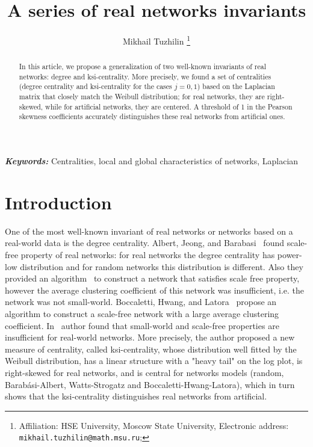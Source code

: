 \documentclass[12pt, a4paper]{extarticle}
\providecommand{\keywords}[1]
{
  \small	
  \textbf{\textit{Keywords:}} #1
}
\begin{document}
\title{A series of real networks invariants}
\author{Mikhail Tuzhilin%
  \thanks{Affiliation: HSE University, Moscow State University, Electronic address: \texttt{mikhail.tuzhilin@math.msu.ru};}
}
\date{}
\maketitle

\begin{abstract}
In this article, we propose a generalization of two well-known invariants of real networks: degree and ksi-centrality. More precisely, we found a set of centralities (degree centrality and ksi-centrality for the cases $j = 0, 1$) based on the Laplacian matrix that closely match the Weibull distribution; for real networks, they are right-skewed, while for artificial networks, they are centered. A threshold of 1 in the Pearson skewness coefficients accurately distinguishes these real networks from artificial ones.
\end{abstract}

\keywords{Centralities, local and global characteristics of networks, Laplacian}


\section{Introduction}

One of the most well-known invariant of real networks or networks based on a real-world data is the degree centrality. Albert, Jeong, and Barabasi~\cite{BA1} found scale-free property of real networks: for real networks the degree centrality has power-low distribution and for random networks this distribution is different. Also they provided an algorithm~\cite{BA2} to construct a network that satisfies scale free property, however the average clustering coefficient of this network was insufficient, i.e. the network was not small-world. Boccaletti, Hwang, and Latora~\cite{BH} propose an algorithm to construct a scale-free network with a large average clustering coefficient. In~\cite{Tuz} author found that small-world and scale-free properties are insufficient for real-world networks. More precisely, the author proposed a new measure of centrality, called ksi-centrality, whose distribution well fitted by the Weibull distribution, has a linear structure with a "heavy tail" on the log plot, is right-skewed for real networks, and is central for  networks models (random, Barabási-Albert, Watts-Strogatz and Boccaletti-Hwang-Latora), which in turn shows that the ksi-centrality distinguishes real networks from artificial. 
\end{document}
